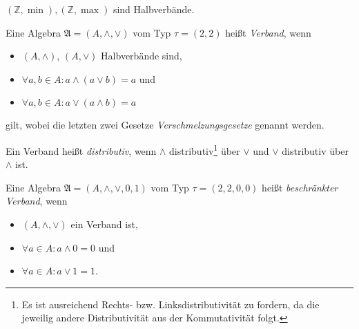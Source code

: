\begin{remark}
    $(\mathbb{Z}, \min), (\mathbb{Z}, \max)$ sind Halbverbände.
\end{remark}

\begin{definition}
    Eine Algebra $\mathfrak{A} = (A, \wedge, \vee)$ vom Typ $\tau = (2, 2)$ heißt \emph{Verband}, wenn
    \begin{itemize}[topsep=0pt, label={--}]
        \item $(A, \wedge)$, $(A, \vee)$ Halbverbände sind, 
        \item $\forall a,b \in A: a \wedge (a \vee b) = a$ und
        \item $\forall a,b \in A: a \vee (a \wedge b) = a$
    \end{itemize}
    gilt, wobei die letzten zwei Gesetze \emph{Verschmelzungsgesetze} genannt werden.

    Ein Verband heißt \emph{distributiv}, wenn $\wedge$ distributiv\footnote{Es ist ausreichend Rechts- bzw. Linksdistributivität zu fordern, da die jeweilig andere Distributivität aus der Kommutativität folgt.} über $\vee$ und $\vee$ distributiv über $\wedge$ ist.

    Eine Algebra $\mathfrak{A} = (A, \wedge, \vee, 0, 1)$ vom Typ $\tau = (2,2,0,0)$ heißt \emph{beschränkter Verband}, wenn
    \begin{itemize}[topsep=0pt, label={--}]
        \item $(A, \wedge, \vee)$ ein Verband ist,
        \item $\forall a \in A: a \wedge 0 = 0$ und
        \item $\forall a \in A: a \vee 1 = 1$.
    \end{itemize}
\end{definition}

